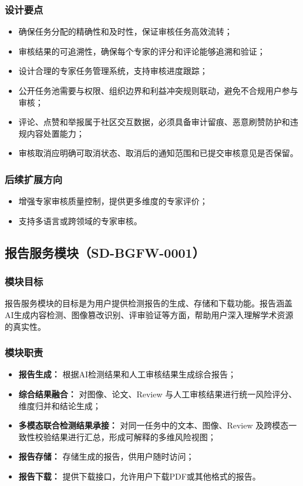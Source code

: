 \subsubsection{设计要点}
\begin{itemize}[leftmargin=2em]
    \item 确保任务分配的精确性和及时性，保证审核任务高效流转；
    \item 审核结果的可追溯性，确保每个专家的评分和评论能够追溯和验证；
    \item 设计合理的专家任务管理系统，支持审核进度跟踪；
    \item 公开任务池需要与权限、组织边界和利益冲突规则联动，避免不合规用户参与审核；
    \item 评论、点赞和举报属于社区交互数据，必须具备审计留痕、恶意刷赞防护和违规内容处置能力；
    \item 审核取消应明确可取消状态、取消后的通知范围和已提交审核意见是否保留。
\end{itemize}

\subsubsection{后续扩展方向}
\begin{itemize}[leftmargin=2em]
   \item 增强专家审核质量控制，提供更多维度的专家评价；
   \item 支持多语言或跨领域的专家审核。
\end{itemize}

\subsection{报告服务模块（SD-BGFW-0001）}

\subsubsection{模块目标}
报告服务模块的目标是为用户提供检测报告的生成、存储和下载功能。报告涵盖AI生成内容检测、图像篡改识别、评审验证等方面，帮助用户深入理解学术资源的真实性。

\subsubsection{模块职责}
\begin{itemize}[leftmargin=2em]
    \item \textbf{报告生成：} 根据AI检测结果和人工审核结果生成综合报告；
    \item \textbf{综合结果融合：} 对图像、论文、Review 与人工审核结果进行统一风险评分、维度归并和结论生成；
    \item \textbf{多模态联合检测结果承接：} 对同一任务中的文本、图像、Review 及跨模态一致性校验结果进行汇总，形成可解释的多维风险视图；
    \item \textbf{报告存储：} 存储生成的报告，供用户随时访问；
    \item \textbf{报告下载：} 提供下载接口，允许用户下载PDF或其他格式的报告。
\end{itemize}

